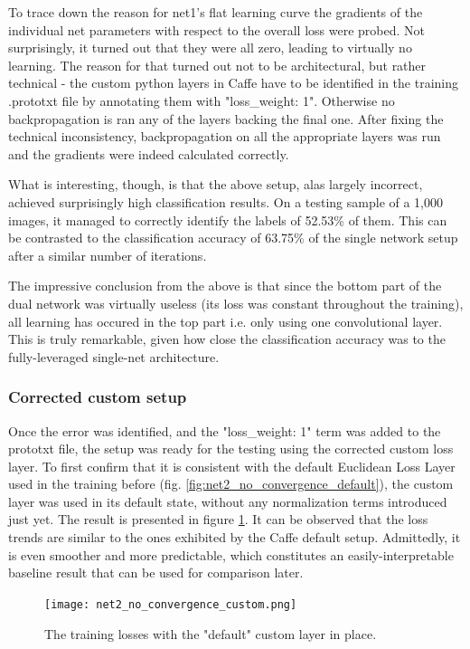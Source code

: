 \documentclass[a4paper, 12pt]{article}
\numberwithin{equation}{section}
\begin{document}
	To trace down the reason for net1's flat learning curve the gradients of the individual net parameters with respect to the overall loss were probed. Not surprisingly, it turned out that they were all zero, leading to virtually no learning. The reason for that turned out not to be architectural, but rather technical - the custom python layers in Caffe have to be identified in the training .prototxt file by annotating them with "loss\_weight: 1". Otherwise no backpropagation is ran any of the layers backing the final one. After fixing the technical inconsistency, backpropagation on all the appropriate layers was run and the gradients were indeed calculated correctly.
	
	What is interesting, though, is that the above setup, alas largely incorrect, achieved surprisingly high classification results. On a testing sample of a 1,000 images, it managed to correctly identify the labels of 52.53\% of them. This can be contrasted to the classification accuracy of 63.75\% of the single network setup after a similar number of iterations.
	
	The impressive conclusion from the above is that since the bottom part of the dual network was virtually useless (its loss was constant throughout the training), all learning has occured in the top part i.e. only using one convolutional layer. This is truly remarkable, given how close the classification accuracy was to the fully-leveraged single-net architecture.
	
	\subsubsection{Corrected custom setup}
	
	Once the error was identified, and the "loss\_weight: 1" term was added to the prototxt file, the setup was ready for the testing using the corrected custom loss layer. To first confirm that it is consistent with the default Euclidean Loss Layer used in the training before (fig. \ref{fig:net2_no_convergence_default}), the custom layer was used in its default state, without any normalization terms introduced just yet. The result is presented in figure \ref{fig:net2_no_convergence_custom}. It can be observed that the loss trends are similar to the ones exhibited by the Caffe default setup. Admittedly, it is even smoother and more predictable, which constitutes an easily-interpretable baseline result that can be used for comparison later.
	
	\begin{figure}[!ht]
		\centering
		\texttt{[image: net2\_no\_convergence\_custom.png]}
		\caption{\label{fig:net2_no_convergence_custom}{The training losses with the "default" custom layer in place.}}
	\end{figure}
	
\end{document}

